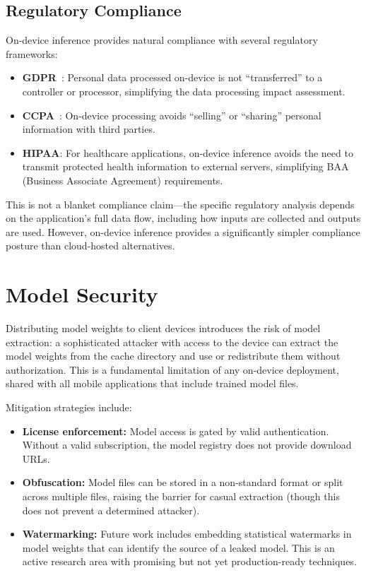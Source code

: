 \documentclass[12pt, letterpaper, twoside]{report}
\begin{document}
\subsection{Regulatory Compliance}
\label{subsec:compliance}

On-device inference provides natural compliance with several regulatory frameworks:

\begin{itemize}[itemsep=1pt, topsep=2pt, parsep=0pt]
\item \textbf{GDPR}~\cite{gdpr2016}: Personal data processed on-device is not ``transferred'' to a controller or processor, simplifying the data processing impact assessment.
\item \textbf{CCPA}~\cite{ccpa2018}: On-device processing avoids ``selling'' or ``sharing'' personal information with third parties.
\item \textbf{HIPAA}: For healthcare applications, on-device inference avoids the need to transmit protected health information to external servers, simplifying BAA (Business Associate Agreement) requirements.
\end{itemize}

This is not a blanket compliance claim---the specific regulatory analysis depends on the application's full data flow, including how inputs are collected and outputs are used. However, on-device inference provides a significantly simpler compliance posture than cloud-hosted alternatives.

\section{Model Security}
\label{sec:model_security}

Distributing model weights to client devices introduces the risk of model extraction: a sophisticated attacker with access to the device can extract the model weights from the cache directory and use or redistribute them without authorization. This is a fundamental limitation of any on-device deployment, shared with all mobile applications that include trained model files.

Mitigation strategies include:

\begin{itemize}[itemsep=1pt, topsep=2pt, parsep=0pt]
\item \textbf{License enforcement:} Model access is gated by valid authentication. Without a valid subscription, the model registry does not provide download URLs.
\item \textbf{Obfuscation:} Model files can be stored in a non-standard format or split across multiple files, raising the barrier for casual extraction (though this does not prevent a determined attacker).
\item \textbf{Watermarking:} Future work includes embedding statistical watermarks in model weights that can identify the source of a leaked model. This is an active research area with promising but not yet production-ready techniques.
\end{itemize}
\end{document}
